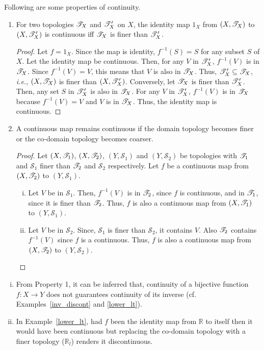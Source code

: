 \documentclass[a4paper,english,12pt]{article}
\begin{document}
Following are some properties of continuity.
\begin{enumerate}
\item For two topologies $\mathscr{T}_X$ and $\mathscr{T}'_X$ on $X$, the identity map $1_X$ from $(X,\mathscr{T}_X)$ to $(X,\mathscr{T}'_X)$ is continuous iff $\mathscr{T}_X$ is finer than $\mathscr{T}'_X$.
\begin{proof}
Let $f=1_X$. Since the map is identity, $f^{-1}(S)=S$ for any subset $S$ of $X$. Let the identity map be continuous. Then, for any $V$ in $\mathscr{T}'_X$, $f^{-1}(V)$ is in $\mathscr{T}_X$. Since $f^{-1}(V)=V$, this means that $V$ is also in $\mathscr{T}_X$. Thus, $\mathscr{T}'_X\subseteq \mathscr{T}_X$, \emph{i.e.}, $(X,\mathscr{T}_X)$ is finer than $(X,\mathscr{T}'_X)$.
Conversely, let $\mathscr{T}_X$ is finer than $\mathscr{T}'_X$. Then, any set $S$ in $\mathscr{T}'_X$ is also in $\mathscr{T}_X$. For any $V$ in $\mathscr{T}'_X$, $f^{-1}(V)$ is in $\mathscr{T}_X$ because $f^{-1}(V)=V$ and $V$ is in $\mathscr{T}_X$. Thus, the identity map is continuous.
\end{proof}

\item A continuous map remains continuous if the domain topology becomes finer or the co-domain topology becomes coarser.
\begin{proof}
Let $(X,\mathscr{T}_1)$, $(X,\mathscr{T}_2)$, $(Y,\mathcal{S}_1)$ and $(Y,\mathcal{S}_2)$ be topologies with $\mathscr{T}_1$ and $\mathcal{S}_1$ finer than $\mathscr{T}_2$ and $\mathcal{S}_2$ respectively. Let $f$ be a continuous map from $(X,\mathscr{T}_2)$ to $(Y,\mathcal{S}_1)$. 
\begin{enumerate}[i)]
\item Let $V$ be in $\mathcal{S}_1$. Then, $f^{-1}(V)$ is in $\mathscr{T}_2$, since $f$ is continuous, and in $\mathscr{T}_1$, since it is finer than $\mathscr{T}_2$. Thus, $f$ is also a continuous map from $(X,\mathscr{T}_1)$ to $(Y,\mathcal{S}_1)$.
\item Let $V$ be in $\mathcal{S}_2$. Since, $\mathcal{S}_1$ is finer than $\mathcal{S}_2$, it contains $V$. Also $\mathscr{T}_2$ contains $f^{-1}(V)$ since $f$ is a continuous. Thus, $f$ is also a continuous map from $(X,\mathscr{T}_2)$ to $(Y,\mathcal{S}_2)$.
\end{enumerate}
\end{proof}

\end{enumerate}

\begin{note} \begin{enumerate}[i)]
\item From Property 1, it can be inferred that, continuity of a bijective function $f:X\to Y$ does not guarantees continuity of its inverse (cf. Examples~\ref{inv_discont} and \ref{lower_lt}).
\item In Example~\ref{lower_lt}, had $f$ been the identity map from $\mathbb{R}$ to itself then it would have been continuous but replacing the co-domain topology with a finer topology ($\mathbb{R}_l$) renders it discontinuous.
\end{enumerate} 

\end{note}
\end{document}
